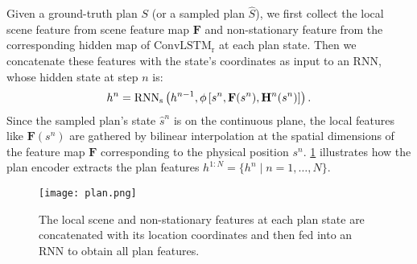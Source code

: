 \documentclass[10pt,twocolumn,letterpaper]{article}
\begin{document}
 Given a ground-truth plan $S$ (or a sampled plan $\hat{S}$), we first collect the local scene feature from scene feature map $\mathbf{F}$ and non-stationary feature from the corresponding hidden map of $\operatorname{ConvLSTM_r}$ at each plan state. Then we concatenate these features with the state's coordinates as input to an RNN, whose hidden state at step $n$ is:
\begin{equation}
h^{n} =\operatorname{RNN_s}\left(h^{n-1},\phi\left[{s}^n,\mathbf{F}({s}^n),\mathbf{H}^n({s}^n)\right]\right). \notag
\end{equation}
Since the sampled plan's state $\hat{s}^n$ is on the continuous plane, the local features like $\mathbf{F}({s}^n)$ are gathered by bilinear interpolation at the spatial dimensions of the feature map $\mathbf{F}$ corresponding to the physical position ${s}^n$. \cref{fig:plan} illustrates how the plan encoder extracts the plan features $h^{1:N}=\{h^n\mid n=1,\dots,N\}$.

\begin{figure}[!h]
	\centering
	\texttt{[image: plan.png]}
	\vspace{-0.2cm}

	\caption{The local scene and non-stationary features at each plan state are concatenated with its location coordinates and then fed into an RNN to obtain all plan features.}

	\label{fig:plan}
\end{figure}
\end{document}
